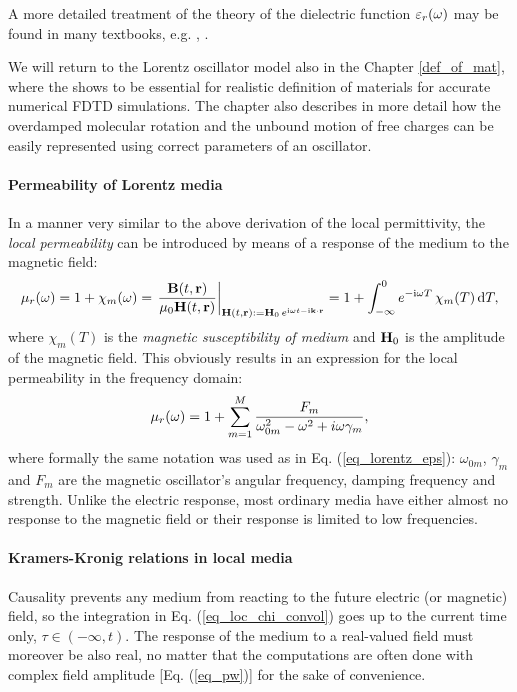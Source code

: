 A more detailed treatment of the theory of the dielectric function $\varepsilon_r(\omega)$ may be found in many textbooks, e.g. \cite[p. 454]{klingshirn2007semiconductor}, \cite{dresselhaus1966optical}. 

We will return to the Lorentz oscillator model also in the Chapter \ref{def_of_mat}, where the shows to be essential for realistic definition of materials for accurate numerical FDTD simulations. The chapter also describes in more detail how the overdamped molecular rotation and the unbound motion of free charges can be easily represented using correct parameters of an oscillator.
\paragraph{Permeability of Lorentz media}  %
In a manner very similar to the above derivation of the local permittivity, the \textit{local permeability} can be introduced by means of a response of the medium to the magnetic field:
\begin{equation} \mu_r(\omega) = 1 + \chi_m(\omega) = \left.\frac{\mathbf{B}(t,{\mathbf{r}})}{\mu_0\mathbf{H}(t,{\mathbf{r}})} \right|_{\mathbf{H}(t, {\mathbf{r}}) := \mathbf{H}_0 \, e^{{\mathrm i}\omega t - {\mathrm i}{\mathbf{k}}\cdot{\mathbf{r}}}} = 1 + \int_{-\infty}^{0} e^{-{\mathrm i}\omega T} \,\chi_m(T) \,\mbox{d}T, \label{eq_mu_loc}\end{equation}
where $\chi_m(T)$ is the \textit{magnetic susceptibility of medium} and $\mathbf{H}_0$ is the amplitude of the magnetic field. This obviously results in an expression for the local permeability in the frequency domain:
\begin{equation} \mu_r(\omega) = 1 + \sum_{m=1}^M \frac{F_m}{\omega_{0m}^2 - \omega^2 + i\omega\gamma_m}, \label{eq_lorentz_mu}\end{equation} %
where formally the same notation was used as in  Eq. (\ref{eq_lorentz_eps}): $\omega_{0m}$, $\gamma_m$ and $F_m$ are the magnetic oscillator's angular frequency, damping frequency and strength. Unlike the electric response, most ordinary media have either almost no response to the magnetic field %
or their response is limited to low frequencies.

\paragraph{Kramers-Kronig relations in local media}%
Causality prevents any medium from reacting to the future electric (or magnetic) field, so the integration in Eq. (\ref{eq_loc_chi_convol}) goes up to the current time only, $\tau \in (-\infty, t)$. The response of the medium to a real-valued field must moreover be also real, no matter that the computations are often done with complex field amplitude [Eq. (\ref{eq_pw})] for the sake of convenience. 

